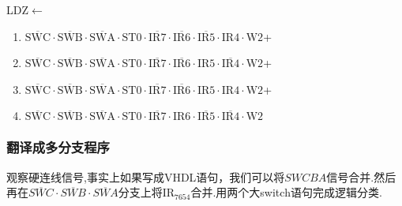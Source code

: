 \documentclass[UTF8]{ctexart}
\begin{document}
LDZ$\leftarrow$
\begin{enumerate}[\indent\indent]
	\item$\overline{\text{SWC}}\cdot\overline{\text{SWB}}\cdot\overline{\text{SWA}}\cdot\text{ST0}\cdot\overline{\text{IR7}}\cdot\overline{\text{IR6}}\cdot\overline{\text{IR5}}\cdot\text{IR4}\cdot\text{W2}$+
	\item$\overline{\text{SWC}}\cdot\overline{\text{SWB}}\cdot\overline{\text{SWA}}\cdot\text{ST0}\cdot\overline{\text{IR7}}\cdot\overline{\text{IR6}}\cdot{\text{IR5}}\cdot\overline{\text{IR4}}\cdot\text{W2}$+
	\item$\overline{\text{SWC}}\cdot\overline{\text{SWB}}\cdot\overline{\text{SWA}}\cdot\text{ST0}\cdot\overline{\text{IR7}}\cdot\overline{\text{IR6}}\cdot\text{IR5}\cdot\text{IR4}\cdot\text{W2}$+
	\item$\overline{\text{SWC}}\cdot\overline{\text{SWB}}\cdot\overline{\text{SWA}}\cdot\text{ST0}\cdot\overline{\text{IR7}}\cdot{\text{IR6}}\cdot\overline{\text{IR5}}\cdot\overline{\text{IR4}}\cdot\text{W2}$
\end{enumerate}

\subsubsection{翻译成多分支程序}
观察硬连线信号,事实上如果写成VHDL语句，我们可以将$SWCBA$信号合并.然后再在$\overline{SWC}\cdot \overline{SWB}\cdot \overline{SWA}$分支上将$\text{IR}_{7654}$合并.用两个大switch语句完成逻辑分类.
\end{document}
